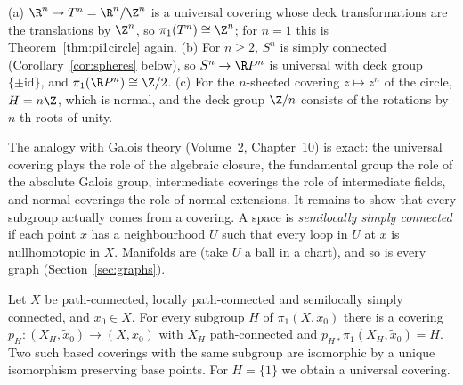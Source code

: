 \begin{example}\label{ex:computations}
(a) $\R^n\to T^n=\R^n/\Z^n$ is a universal covering whose deck transformations are the translations by $\Z^n$, so $\pi_1(T^n)\cong\Z^n$; for $n=1$ this is Theorem~\ref{thm:pi1circle} again.
(b) For $n\ge2$, $S^n$ is simply connected (Corollary~\ref{cor:spheres} below), so $S^n\to\R P^n$ is universal with deck group $\{\pm\mathrm{id}\}$, and $\pi_1(\R P^n)\cong\Z/2$. (c) For the
$n$-sheeted covering $z\mapsto z^n$ of the circle, $H=n\Z$, which is normal, and the deck group $\Z/n$ consists of the rotations by $n$-th roots of unity.
\end{example}

The analogy with Galois theory (Volume~2, Chapter~10) is exact: the universal covering plays the role of the algebraic closure, the fundamental group the role of the absolute Galois
group, intermediate coverings the role of intermediate fields, and normal coverings the role of normal extensions. It remains to show that every subgroup actually comes from a
covering. A space is \emph{semilocally simply connected} if each point $x$ has a neighbourhood $U$ such that every loop in $U$ at $x$ is nullhomotopic in $X$. Manifolds are (take $U$ a ball in a
chart), and so is every graph (Section~\ref{sec:graphs}).

\begin{theorem}\label{thm:galois}
Let $X$ be path-connected, locally path-connected and semilocally simply connected, and $x_0\in X$. For every subgroup $H$ of $\pi_1(X,x_0)$ there is a covering
$p_H\colon(X_H,\tilde x_0)\to(X,x_0)$ with $X_H$ path-connected and $p_{H*}\pi_1(X_H,\tilde x_0)=H$. Two such based coverings with the same subgroup are isomorphic by a unique isomorphism
preserving base points. For $H=\{1\}$ we obtain a universal covering.
\end{theorem}

